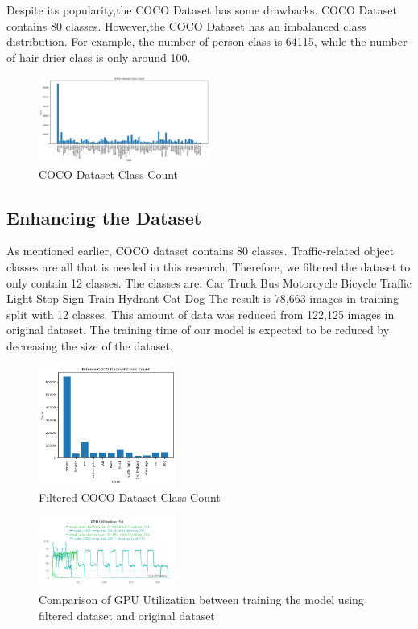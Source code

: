 \documentclass[conference]{IEEEtran}
\begin{document}
Despite its popularity,the COCO Dataset has some drawbacks. COCO Dataset contains 80 classes. However,the COCO Dataset has an imbalanced class distribution.
For example, the number of person class is 64115, while the number of hair drier class is only around 100.
\begin{figure}[h]
\centering
\includegraphics[width=0.5\textwidth,keepaspectratio]{coco_class_count.png}
\caption{COCO Dataset Class Count}
\end{figure}


\subsection{Enhancing the Dataset}\label{Filtering}
As mentioned earlier, COCO dataset contains 80 classes. Traffic-related object classes are all that is needed in this research.
Therefore, we filtered the dataset to only contain 12 classes. The classes are:
Car Truck Bus Motorcycle Bicycle Traffic Light Stop Sign Train Hydrant Cat Dog
The result is 78,663 images in training split with 12 classes. This amount of data was reduced from 122,125 images in original dataset. The training time of our model is expected to be reduced by decreasing the size of the dataset.
\begin{figure}[h!]
\centering
\includegraphics[width=0.4\textwidth]{filtered_coco_class_count.png}
\caption{Filtered COCO Dataset Class Count}
\label{fig:COCOFiltered}
\end{figure}

\begin{figure}[h!]
\centering
\includegraphics[width=0.4\textwidth,keepaspectratio]{gpu_utilization_comparison_original_and_filtered.png}
\caption{Comparison of GPU Utilization between training the model using filtered dataset and original dataset}
\label{fig:original_filtered_gpu_utilization}
\end{figure}
\end{document}
